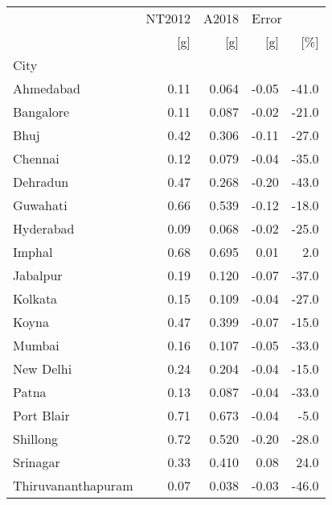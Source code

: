 \begin{tabular}{lrrrr}
\toprule
{} & NT2012 &  A2018 & \multicolumn{2}{l}{Error} \\
{} &    [g] &    [g] &   [g] &   [\%] \\
City               &        &        &       &       \\
\midrule
Ahmedabad          &   0.11 &  0.064 & -0.05 & -41.0 \\
Bangalore          &   0.11 &  0.087 & -0.02 & -21.0 \\
Bhuj               &   0.42 &  0.306 & -0.11 & -27.0 \\
Chennai            &   0.12 &  0.079 & -0.04 & -35.0 \\
Dehradun           &   0.47 &  0.268 & -0.20 & -43.0 \\
Guwahati           &   0.66 &  0.539 & -0.12 & -18.0 \\
Hyderabad          &   0.09 &  0.068 & -0.02 & -25.0 \\
Imphal             &   0.68 &  0.695 &  0.01 &   2.0 \\
Jabalpur           &   0.19 &  0.120 & -0.07 & -37.0 \\
Kolkata            &   0.15 &  0.109 & -0.04 & -27.0 \\
Koyna              &   0.47 &  0.399 & -0.07 & -15.0 \\
Mumbai             &   0.16 &  0.107 & -0.05 & -33.0 \\
New Delhi          &   0.24 &  0.204 & -0.04 & -15.0 \\
Patna              &   0.13 &  0.087 & -0.04 & -33.0 \\
Port Blair         &   0.71 &  0.673 & -0.04 &  -5.0 \\
Shillong           &   0.72 &  0.520 & -0.20 & -28.0 \\
Srinagar           &   0.33 &  0.410 &  0.08 &  24.0 \\
Thiruvananthapuram &   0.07 &  0.038 & -0.03 & -46.0 \\
\bottomrule
\end{tabular}
